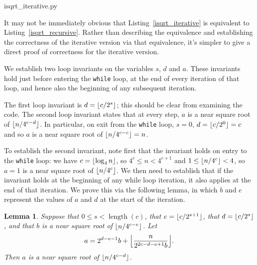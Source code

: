 \documentclass[a4paper]{article}
\DeclarePairedDelimiter\floor{\lfloor}{\rfloor}
\DeclareMathOperator{\length}{length}
\theoremstyle{plain}
\newtheorem{lemma}[theorem]{Lemma}
\theoremstyle{definition}
\begin{document}

  {isqrt_iterative.py}

It may not be immediately obvious that Listing~\ref{isqrt_iterative} is
equivalent to Listing~\ref{isqrt_recursive}. Rather than describing the
equivalence and establishing the correctness of the iterative version via that
equivalence, it's simpler to give a direct proof of correctness for the
iterative version.

We establish two loop invariants on the variables $s$, $d$ and $a$. These
invariants hold just before entering the \lstinline$while$ loop, at the end
of every iteration of that loop, and hence also the beginning of any subsequent
iteration.

The first loop invariant is $d = \floor{c/2^s}$; this should be clear from
examining the code. The second loop invariant states that at every step, $a$ is
a near square root of $\floor{n / 4^{c-d}}$. In particular, on exit from the
\lstinline$while$ loop, $s = 0$, $d = \floor{c/2^0} = c$ and so $a$ is a near
square root of $\floor{n / 4^{c-c}} = n$.

To establish the second invariant, note first that the invariant holds on
entry to the \lstinline$while$ loop: we have $c = \floor{\log_4 n}$, so
$4^c \le n < 4^{c+1}$ and $1 \le \floor{n / 4^c} < 4$, so $a = 1$ is a near
square root of $\floor{n / 4^c}$. We then need to establish that if the
invariant holds at the beginning of any while loop iteration, it also applies
at the end of that iteration. We prove this via the following lemma, in which
$b$ and $e$ represent the values of $a$ and $d$ at the start of the iteration.

\begin{lemma}
  Suppose that $0 \le s < \length(c)$, that $e = \floor{c / 2^{s + 1}}$, that
  $d = \floor{c / 2^s}$, and that $b$ is a near square root of $\floor{n /
  4^{c-e}}$. Let
  $$a = 2^{d-e-1}b + \floor*{\frac{n}{2^{2c-d-e+1}b}}.$$ Then $a$ is a near
  square root of $\floor{n / 4^{c-d}}$.
\end{lemma}
\end{document}
